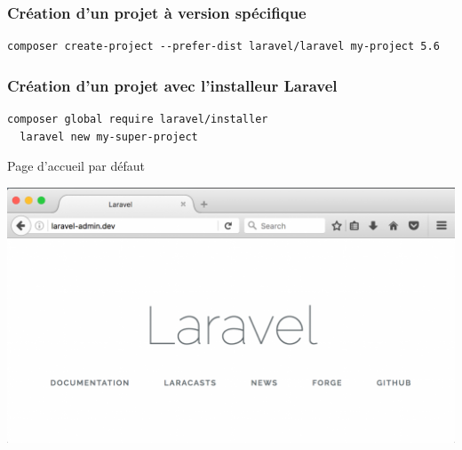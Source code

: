 \documentclass{beamer}
\begin{document}
\begin{frame}[fragile]
\frametitle{Création d'un projet à version spécifique}
\begin{Verbatim}[fontsize=\scriptsize]
  composer create-project --prefer-dist laravel/laravel my-project 5.6
\end{Verbatim}
\end{frame}

\begin{frame}[fragile]
\frametitle{Création d'un projet avec l'installeur Laravel}
\begin{Verbatim}[fontsize=\small]
  composer global require laravel/installer
  laravel new my-super-project
\end{Verbatim}
\end{frame}

\begin{frame}{Page d'accueil par défaut}
\begin{center}
  \includegraphics[scale=0.4]{images/laravel-welcome-page.png}
\end{center}
\end{frame}
\end{document}
